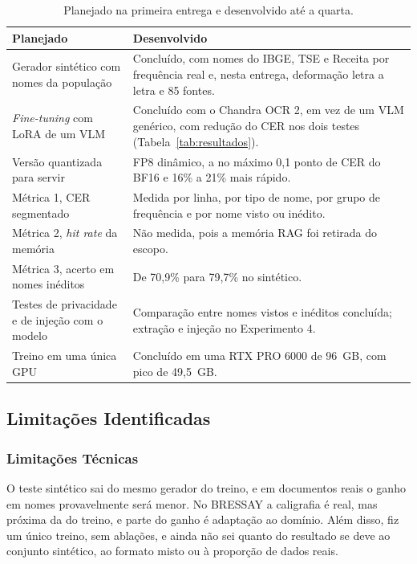 \documentclass[12pt,a4paper]{article}
\begin{document}
\begin{table}[H]
\centering
\small
\begin{tabular}{@{}p{5.4cm}p{9.4cm}@{}}
\toprule
Planejado & Desenvolvido \\
\midrule
Gerador sintético com nomes da população & Concluído, com nomes do IBGE, TSE e Receita por frequência real e, nesta entrega, deformação letra a letra e 85 fontes. \\
\emph{Fine-tuning} com LoRA de um VLM & Concluído com o Chandra OCR 2, em vez de um VLM genérico, com redução do CER nos dois testes (Tabela~\ref{tab:resultados}). \\
Versão quantizada para servir & FP8 dinâmico, a no máximo 0,1 ponto de CER do BF16 e 16\% a 21\% mais rápido. \\
Métrica 1, CER segmentado & Medida por linha, por tipo de nome, por grupo de frequência e por nome visto ou inédito. \\
Métrica 2, \emph{hit rate} da memória & Não medida, pois a memória RAG foi retirada do escopo. \\
Métrica 3, acerto em nomes inéditos & De 70,9\% para 79,7\% no sintético. \\
Testes de privacidade e de injeção com o modelo & Comparação entre nomes vistos e inéditos concluída; extração e injeção no Experimento 4. \\
Treino em uma única GPU & Concluído em uma RTX PRO 6000 de 96~GB, com pico de 49,5~GB. \\
\bottomrule
\end{tabular}
\caption{Planejado na primeira entrega e desenvolvido até a quarta.}
\label{tab:planejado}
\end{table}

\subsection{Limitações Identificadas}

\subsubsection{Limitações Técnicas}
O teste sintético sai do mesmo gerador do treino, e em documentos reais o ganho em nomes provavelmente será menor. No BRESSAY a caligrafia é real, mas próxima da do treino, e parte do ganho é adaptação ao domínio. Além disso, fiz um único treino, sem ablações, e ainda não sei quanto do resultado se deve ao conjunto sintético, ao formato misto ou à proporção de dados reais.
\end{document}
